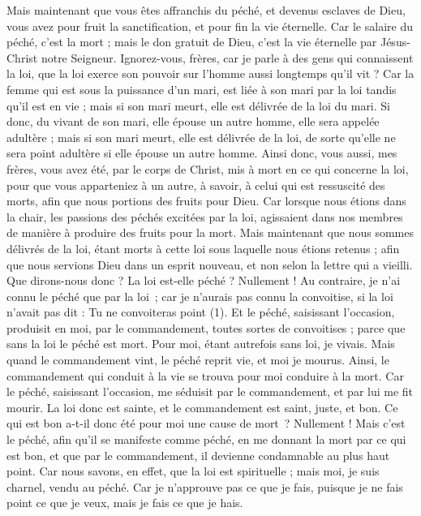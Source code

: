 \begin{multicols}{2}
Mais maintenant que vous êtes affranchis du péché, et devenus esclaves de Dieu, vous avez pour fruit la sanctification, et pour fin la vie éternelle.
Car le salaire du péché, c'est la mort ; mais le don gratuit de Dieu, c'est la vie éternelle par Jésus-Christ notre Seigneur.
\VerseOne{}Ignorez-vous, frères, car je parle à des gens qui connaissent la loi, que la loi exerce son pouvoir sur l’homme aussi longtemps qu’il vit ?
Car la femme qui est sous la puissance d'un mari, est liée à son mari par la loi tandis qu'il est en vie ; mais si son mari meurt, elle est délivrée de la loi du mari.
Si donc, du vivant de son mari, elle épouse un autre homme, elle sera appelée adultère ; mais si son mari meurt, elle est délivrée de la loi, de sorte qu'elle ne sera point adultère si elle épouse un autre homme.
Ainsi donc, vous aussi, mes frères, vous avez été, par le corps de Christ, mis à mort en ce qui concerne la loi, pour que vous apparteniez à un autre, à savoir, à celui qui est ressuscité des morts, afin que nous portions des fruits pour Dieu.
Car lorsque nous étions dans la chair, les passions des péchés excitées par la loi, agissaient dans nos membres de manière à produire des fruits pour la mort.
Mais maintenant que nous sommes délivrés de la loi, étant morts à cette loi sous laquelle nous étions retenus ; afin que nous servions Dieu dans un esprit nouveau, et non selon la lettre qui a vieilli.
Que dirons-nous donc ? La loi est-elle péché ? Nullement ! Au contraire, je n'ai connu le péché que par la loi ; car je n’aurais pas connu la convoitise, si la loi n’avait pas dit : Tu ne convoiteras point (1).
Et le péché, saisissant l’occasion, produisit en moi, par le commandement, toutes sortes de convoitises ; parce que sans la loi le péché est mort.
Pour moi, étant autrefois sans loi, je vivais. Mais quand le commandement vint, le péché reprit vie, et moi je mourus.
Ainsi, le commandement qui conduit à la vie se trouva pour moi conduire à la mort.
Car le péché, saisissant l’occasion, me séduisit par le commandement, et par lui me fit mourir.
La loi donc est sainte, et le commandement est saint, juste, et bon.
Ce qui est bon a-t-il donc été pour moi une cause de mort ? Nullement ! Mais c’est le péché, afin qu'il se manifeste comme péché, en me donnant la mort par ce qui est bon, et que par le commandement, il devienne condamnable au plus haut point.
Car nous savons, en effet, que la loi est spirituelle ; mais moi, je suis charnel, vendu au péché.
Car je n'approuve pas ce que je fais, puisque je ne fais point ce que je veux, mais je fais ce que je hais.

\end{multicols}
